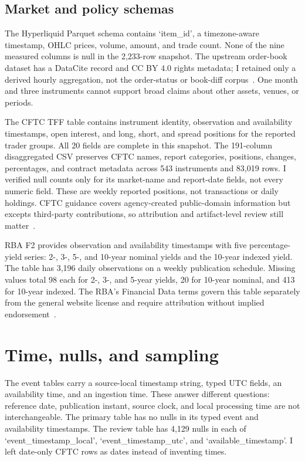 \documentclass[10pt]{article}
\begin{document}
\subsection{Market and policy schemas}
The Hyperliquid Parquet schema contains `item\_id', a timezone-aware timestamp, OHLC prices, volume, amount, and trade count. None of the nine measured columns is null in the 2,233-row snapshot. The upstream order-book dataset has a DataCite record and CC BY 4.0 rights metadata; I retained only a derived hourly aggregation, not the order-status or book-diff corpus~\cite{albers2026,dataciteapi}. One month and three instruments cannot support broad claims about other assets, venues, or periods.

The CFTC TFF table contains instrument identity, observation and availability timestamps, open interest, and long, short, and spread positions for the reported trader groups. All 20 fields are complete in this snapshot. The 191-column disaggregated CSV preserves CFTC names, report categories, positions, changes, percentages, and contract metadata across 543 instruments and 83,019 rows. I verified null counts only for its market-name and report-date fields, not every numeric field. These are weekly reported positions, not transactions or daily holdings. CFTC guidance covers agency-created public-domain information but excepts third-party contributions, so attribution and artifact-level review still matter~\cite{cftctff,cftcterms}.

RBA F2 provides observation and availability timestamps with five percentage-yield series: 2-, 3-, 5-, and 10-year nominal yields and the 10-year indexed yield. The table has 3,196 daily observations on a weekly publication schedule. Missing values total 98 each for 2-, 3-, and 5-year yields, 20 for 10-year nominal, and 413 for 10-year indexed. The RBA's Financial Data terms govern this table separately from the general website license and require attribution without implied endorsement~\cite{rbaf2,rbaterms}.

\section{Time, nulls, and sampling}
The event tables carry a source-local timestamp string, typed UTC fields, an availability time, and an ingestion time. These answer different questions: reference date, publication instant, source clock, and local processing time are not interchangeable. The primary table has no nulls in its typed event and availability timestamps. The review table has 4,129 nulls in each of `event\_timestamp\_local', `event\_timestamp\_utc', and `available\_timestamp'. I left date-only CFTC rows as dates instead of inventing times.
\end{document}
